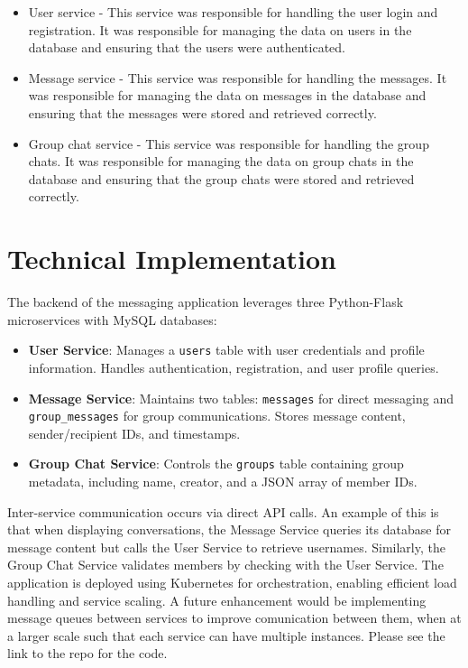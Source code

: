 \documentclass[12pt]{Article}
\begin{document}
\begin{itemize}
    \item User service - This service was responsible for handling the user login and registration. It was responsible for managing the data on users in the database and ensuring that the users were authenticated.
    \item Message service - This service was responsible for handling the messages. It was responsible for managing the data on messages in the database and ensuring that the messages were stored and retrieved correctly.
    \item Group chat service - This service was responsible for handling the group chats. It was responsible for managing the data on group chats in the database and ensuring that the group chats were stored and retrieved correctly.
\end{itemize}

\section{Technical Implementation}
The backend of the messaging application leverages three Python-Flask microservices with MySQL databases:

\begin{itemize}
    \item \textbf{User Service}: Manages a \texttt{users} table with user credentials and profile information. Handles authentication, registration, and user profile queries.
    
    \item \textbf{Message Service}: Maintains two tables: \texttt{messages} for direct messaging and \texttt{group\_messages} for group communications. Stores message content, sender/recipient IDs, and timestamps.
    
    \item \textbf{Group Chat Service}: Controls the \texttt{groups} table containing group metadata, including name, creator, and a JSON array of member IDs.
\end{itemize}

\noindent Inter-service communication occurs via direct API calls. An example of this is that when displaying conversations, the Message Service queries its database for message content but calls the User Service to retrieve usernames. Similarly, the Group Chat Service validates members by checking with the User Service.
The application is deployed using Kubernetes for orchestration, enabling efficient load handling and service scaling.
A future enhancement would be implementing message queues between services to improve comunication between them, when at a larger scale such that each service can have multiple instances.
Please see the link to the repo for the code.
\end{document}
